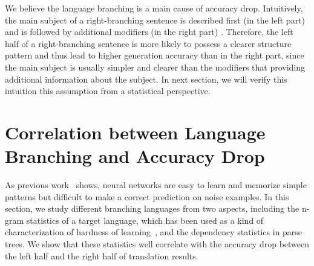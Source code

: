 \documentclass[11pt,a4paper]{article}
\begin{document}
We believe the language branching is a main cause of accuracy drop. Intuitively, the main subject of a right-branching sentence is described first (in the left part) and is followed by additional modifiers (in the right part) \cite{berg2011structure}. Therefore, the left half of a right-branching sentence is more likely to possess a clearer structure pattern and thus lead to higher generation accuracy than in the right part, since the main subject is usually simpler and clearer than the modifiers that providing additional information about the subject. In next section, we will verify this intuition this assumption from a statistical perspective.




\section{Correlation between Language Branching and Accuracy Drop}
As previous work~\cite{DBLP:conf/icml/ArpitJBKBKMFCBL17} shows, neural networks are easy to learn and memorize simple patterns but difficult to make a correct prediction on noise examples. In this section, we study different branching languages from two aspects, including the n-gram statistics of a target language, which has been used as a kind of characterization of hardness of learning~\cite{bengio2009curriculum}, and the dependency statistics in parse trees. We show that these statistics well correlate with the accuracy drop between the left half and the right half of translation results.
\end{document}
